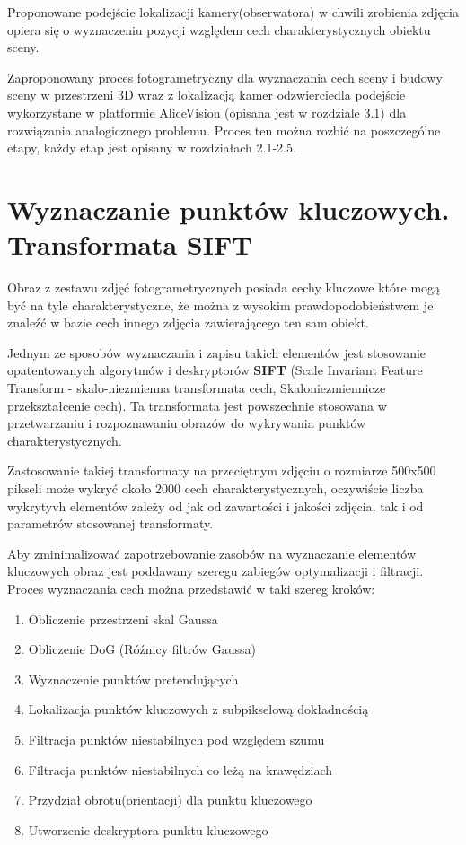 Proponowane podejście lokalizacji kamery(obserwatora) w chwili zrobienia zdjęcia opiera się o wyznaczeniu pozycji względem cech charakterystycznych obiektu sceny.

Zaproponowany proces fotogrametryczny dla wyznaczania cech sceny i budowy sceny w przestrzeni 3D wraz z lokalizacją kamer odzwierciedla podejście wykorzystane w platformie AliceVision (opisana jest w rozdziale 3.1) dla rozwiązania analogicznego problemu. Proces ten można rozbić na poszczególne etapy, każdy etap jest opisany w rozdziałach 2.1-2.5.

\section{Wyznaczanie punktów kluczowych. Transformata SIFT}
Obraz z zestawu zdjęć fotogrametrycznych posiada cechy kluczowe które mogą być na tyle charakterystyczne, że można z wysokim prawdopodobieństwem je znaleźć w bazie cech innego zdjęcia zawierającego ten sam obiekt.

Jednym ze sposobów wyznaczania i zapisu takich elementów jest stosowanie opatentowanych algorytmów i deskryptorów \textbf{SIFT} (Scale Invariant Feature Transform - skalo-niezmienna transformata cech, Skaloniezmiennicze przekształcenie cech). Ta transformata jest powszechnie stosowana w przetwarzaniu i rozpoznawaniu obrazów do wykrywania punktów charakterystycznych.

Zastosowanie takiej transformaty na przeciętnym zdjęciu o rozmiarze 500x500 pikseli może wykryć około 2000 cech charakterystycznych, oczywiście liczba wykrytyvh elementów zależy od jak od zawartości i jakości zdjęcia, tak i od parametrów stosowanej transformaty.

Aby zminimalizować zapotrzebowanie zasobów na wyznaczanie elementów kluczowych obraz jest poddawany szeregu zabiegów optymalizacji i filtracji. Proces wyznaczania cech można przedstawić w taki szereg kroków:
\begin{enumerate}
   \item Obliczenie przestrzeni skal Gaussa
   \item Obliczenie DoG (Róźnicy filtrów Gaussa)
   \item Wyznaczenie punktów pretendujących
   \item Lokalizacja punktów kluczowych z subpikselową dokładnością
   \item Filtracja punktów niestabilnych pod względem szumu
   \item Filtracja punktów niestabilnych co leżą na krawędziach
   \item Przydział obrotu(orientacji) dla punktu kluczowego
   \item Utworzenie deskryptora punktu kluczowego
\end{enumerate}

